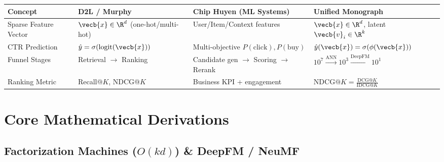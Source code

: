 \documentclass[../../../../master.tex]{subfiles}
\begin{document}
\begin{crossbook}
\begin{center}
\footnotesize
\begin{tabularx}{\linewidth}{@{} >{\raggedright\arraybackslash}p{2.6cm} >{\raggedright\arraybackslash}X >{\raggedright\arraybackslash}X >{\raggedright\arraybackslash}X @{}}
\toprule
\textbf{Concept} & \textbf{D2L / Murphy} & \textbf{Chip Huyen (ML Systems)} & \textbf{Unified Monograph} \\
\midrule
Sparse Feature Vector & $\vecb{x} \in \R^d$ (one-hot/multi-hot) & User/Item/Context features & $\vecb{x} \in \R^d$, latent $\vecb{v}_i \in \R^k$ \\
CTR Prediction & $\hat{y} = \sigma(\text{logit}(\vecb{x}))$ & Multi-objective $P(\text{click}), P(\text{buy})$ & $\hat{y}(\vecb{x}) = \sigma(\phi(\vecb{x}))$ \\
Funnel Stages & Retrieval $\to$ Ranking & Candidate gen $\to$ Scoring $\to$ Rerank & $10^7 \xrightarrow{\text{ANN}} 10^3 \xrightarrow{\text{DeepFM}} 10^1$ \\
Ranking Metric & Recall@$K$, NDCG@$K$ & Business KPI + engagement & $\mathrm{NDCG}@K = \frac{\mathrm{DCG}@K}{\mathrm{IDCG}@K}$ \\
\bottomrule
\end{tabularx}
\end{center}
\end{crossbook}

\section{Core Mathematical Derivations}

\subsection{Factorization Machines ($O(kd)$) \& DeepFM / NeuMF}
\end{document}
